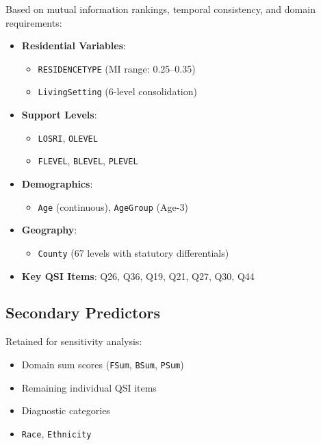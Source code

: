 Based on mutual information rankings, temporal consistency, and domain requirements:

\begin{itemize}
    \item \textbf{Residential Variables}: 
    \begin{itemize}
        \item \texttt{RESIDENCETYPE} (MI range: 0.25--0.35)
        \item \texttt{LivingSetting} (6-level consolidation)
    \end{itemize}
    
    \item \textbf{Support Levels}: 
    \begin{itemize}
        \item \texttt{LOSRI}, \texttt{OLEVEL}
        \item \texttt{FLEVEL}, \texttt{BLEVEL}, \texttt{PLEVEL}
    \end{itemize}
    
    \item \textbf{Demographics}: 
    \begin{itemize}
        \item \texttt{Age} (continuous), \texttt{AgeGroup} (Age-3)
    \end{itemize}
    
    \item \textbf{Geography}: 
    \begin{itemize}
        \item \texttt{County} (67 levels with statutory differentials)
    \end{itemize}
    
    \item \textbf{Key QSI Items}: Q26, Q36, Q19, Q21, Q27, Q30, Q44
\end{itemize}

\subsection{Secondary Predictors}

Retained for sensitivity analysis:
\begin{itemize}
    \item Domain sum scores (\texttt{FSum}, \texttt{BSum}, \texttt{PSum})
    \item Remaining individual QSI items
    \item Diagnostic categories
    \item \texttt{Race}, \texttt{Ethnicity}
\end{itemize}

